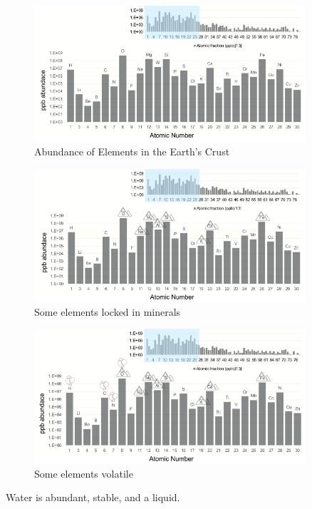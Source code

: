 \documentclass[]{article}
\begin{document}
\begin{figure}[H]
	\caption{Abundance of Elements in the Earth's Crust}\label{fig:abundances2}  
	\includegraphics[width=0.9\textwidth]{AbundancesEarth}
\end{figure}

\begin{figure}[H]
	\caption{Some elements locked in minerals}\label{fig:minerals} 
	\includegraphics[width=0.9\textwidth]{AbundancesMinerals}
\end{figure}

\begin{figure}[H]
	\caption{Some elements volatile}\label{fig:volatiles} 
	\includegraphics[width=0.9\textwidth]{AbundancesGases}
\end{figure}

Water is abundant, stable, and a liquid.
\end{document}
